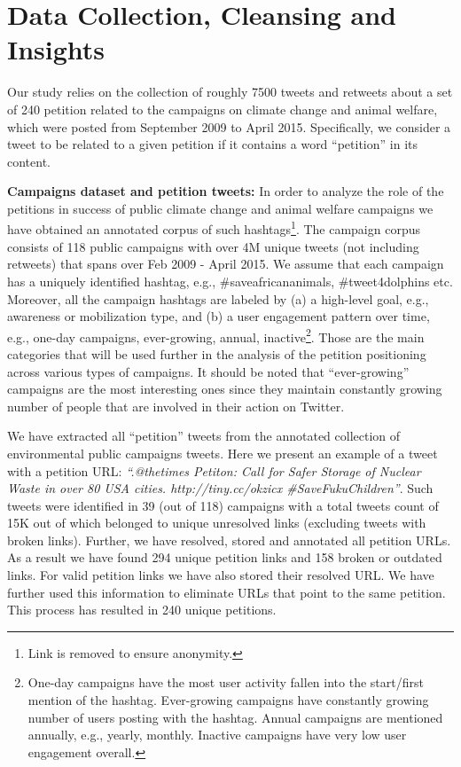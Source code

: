 \section{Data Collection, Cleansing and Insights}
\label{sec:dataset}

Our study relies on the collection of roughly 7500 tweets and retweets about a set of 240 petition related to the campaigns on climate change and animal welfare, which were posted from September 2009 to April 2015. Specifically, we consider a tweet to be related to a given petition if it contains a word ``petition'' in its content.

\textbf{Campaigns dataset and petition tweets:}
In order to analyze the role of the petitions in success of public climate change and animal welfare campaigns
we have obtained an annotated corpus of such hashtags\footnote{Link is removed to ensure anonymity.}.
The campaign corpus consists of 118 public campaigns with over 4M unique tweets (not including retweets) that spans over Feb 2009 - April 2015. 
We assume that each campaign has a uniquely identified hashtag, e.g., \#saveafricananimals, \#tweet4dolphins etc.
Moreover, all the campaign hashtags are labeled by (a) a high-level goal, e.g., awareness or mobilization type, and (b) a user engagement pattern over time, e.g., one-day campaigns, ever-growing, annual, inactive\footnote{One-day campaigns have the most user activity fallen into the start/first mention of the hashtag.
Ever-growing campaigns have constantly growing number of users posting with the hashtag.
Annual campaigns are mentioned annually, e.g., yearly, monthly. Inactive campaigns have very low user engagement overall.}.
Those are the main categories that will be used further in the analysis of the petition positioning across various types of campaigns. It should be noted that ``ever-growing'' campaigns are the most interesting ones since they maintain constantly growing number of people that are involved in their action on Twitter.

We have extracted all ``petition'' tweets from the annotated collection of environmental public campaigns tweets.
Here we present an example of a tweet with a petition URL: \textit{``.@thetimes Petiton: Call for Safer Storage of Nuclear Waste in over 80 USA cities. http://tiny.cc/okzicx  \#SaveFukuChildren''}.
Such tweets were identified in 39 (out of 118) campaigns with a total tweets count of 15K out of which belonged to unique unresolved links (excluding tweets with broken links).
Further, we have resolved, stored and annotated all petition URLs. As a result we have found 294 unique petition links and 158 broken or outdated links.
For valid petition links we have also stored their resolved URL. We have further used this information to eliminate URLs that point to the same petition.
This process has resulted in 240 unique petitions.

